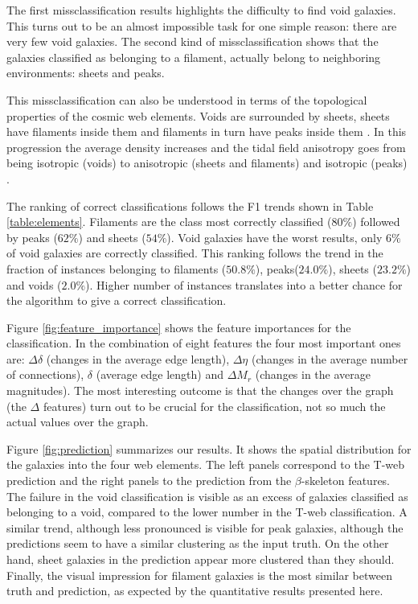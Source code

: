 \documentclass[usenatbib]{mnras}
\begin{document}
The first missclassification results highlights the difficulty to find
void galaxies.
This turns out to be an almost impossible task for one simple reason:
there are very few void galaxies.
The second kind of missclassification shows that the galaxies
classified as belonging to a filament, actually belong to neighboring
environments: sheets and peaks.

This missclassification can also be understood in terms of the
topological properties of the cosmic web elements. 
Voids are surrounded by sheets, sheets have filaments inside them and
filaments in turn have peaks inside them \citep{Cautun2014}. 
In this progression the average density increases and the tidal field
anisotropy goes from being isotropic (voids) to anisotropic (sheets
and filaments) and isotropic (peaks) \citep{2015MNRAS.453..497B}.

The ranking of correct classifications follows the F1 trends
shown in Table \ref{table:elements}.
Filaments are the class most correctly classified ($80\%$) followed by
peaks ($62\%$) and sheets ($54\%$).
Void galaxies have the worst results, only $6\%$ of void galaxies are
correctly classified.
This ranking follows the trend in the fraction of instances belonging to
filaments ($50.8\%$), peaks($24.0\%$), sheets ($23.2\%$) and voids ($2.0\%$).
Higher number of instances translates into a better chance for the algorithm to give a correct classification.


Figure \ref{fig:feature_importance} shows the feature
importances for the classification.
In the combination of eight features the four most important ones are:
$\Delta \delta$ (changes in the average edge length), $\Delta \eta$
(changes in the average number of connections), $\delta$ (average edge
length) and $\Delta M_r$ (changes in the average magnitudes).
The most interesting outcome is that the changes over the graph (the 
$\Delta$ features) turn out to be crucial for the classification, not
so much the actual values over the graph.

Figure  \ref{fig:prediction} summarizes our results. 
It shows the spatial distribution for the galaxies into the four web
elements. 
The left panels correspond to the T-web prediction and the right
panels to the prediction from the $\beta$-skeleton features.
The failure in the void classification is visible as an excess of
galaxies classified as belonging to a void, compared to the lower
number in the T-web classification.
A similar trend, although less pronounced is visible for peak
galaxies, although the predictions seem to have a similar clustering
as the input truth. 
On the other hand, sheet galaxies in the prediction appear more
clustered than they should.
Finally, the visual impression for filament galaxies is the most
similar between truth and prediction, as expected by the quantitative
results presented here.
\end{document}
